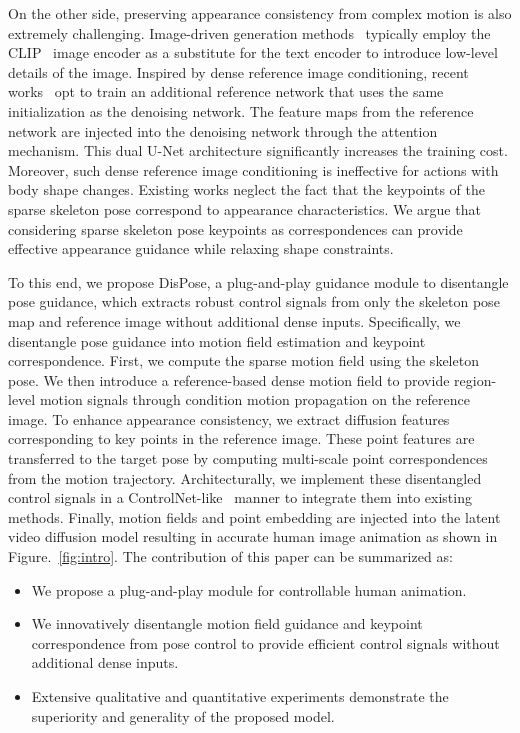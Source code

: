 On the other side, preserving appearance consistency from complex motion is also extremely challenging. Image-driven generation methods~\citep{zhang2023adding,ye2023ip,wang2024instantid} typically employ the CLIP~\citep{radford2021learning} image encoder as a substitute for the text encoder to introduce low-level details of the image.
{Inspired by dense reference image conditioning, recent works~\citep{hu2023animate, xu2024magicanimate} opt to train an additional reference network that uses the same initialization as the denoising network.} The feature maps from the reference network are injected into the denoising network through the attention mechanism. This dual U-Net architecture significantly increases the training cost.
Moreover, such dense reference image conditioning is ineffective for actions with body shape changes.
Existing works neglect the fact that the keypoints of the sparse skeleton pose correspond to appearance characteristics.
We argue that considering sparse skeleton pose keypoints as correspondences can provide effective appearance guidance while relaxing shape constraints.

To this end, we propose DisPose, a plug-and-play guidance module to disentangle pose guidance, which extracts robust control signals from only the skeleton pose map and reference image without additional dense inputs.
Specifically, we disentangle pose guidance into motion field estimation and keypoint correspondence. First, we compute the sparse motion field using the skeleton pose.
We then introduce a reference-based dense motion field to provide region-level motion signals through condition motion propagation on the reference image.
To enhance appearance consistency, we extract diffusion features corresponding to key points in the reference image. These point features are transferred to the target pose by computing multi-scale point correspondences from the motion trajectory.
Architecturally, we implement these disentangled control signals in a ControlNet-like~\citep{zhang2023adding} manner to integrate them into existing methods.
Finally, motion fields and point embedding are injected into the latent video diffusion model resulting in accurate human image animation as shown in Figure.~\ref{fig:intro}. 
The contribution of this paper can be summarized as:
\begin{itemize}[topsep=0pt, partopsep=0pt, leftmargin=13pt, parsep=0pt, itemsep=3pt]
     \item  We propose a plug-and-play module for controllable human animation.
     \item  We innovatively disentangle motion field guidance and keypoint correspondence from pose control to provide efficient control signals without additional dense inputs.
     \item  Extensive qualitative and quantitative experiments demonstrate the superiority and generality of the proposed model.
\end{itemize}
